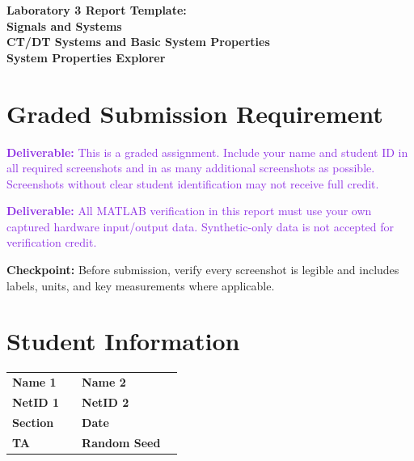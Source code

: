 \documentclass[11pt,letterpaper]{article}
\providecommand{\cpECE}[1]{\textcolor{OliveGreen}{\textbf{Checkpoint:} #1}}
\providecommand{\delECE}[1]{\textcolor{BlueViolet}{\textbf{Deliverable:} #1}}
\begin{document}
\begin{center}
\huge{\bf Laboratory 3 Report Template:}\\
\large{\bf Signals and Systems}\\
\large{\bf CT/DT Systems and Basic System Properties}\\
\large{\bf System Properties Explorer}
\end{center}

\section*{Graded Submission Requirement}
\delECE{This is a graded assignment. Include your name and student ID in all required screenshots and in as many additional screenshots as possible. Screenshots without clear student identification may not receive full credit.}

\delECE{All MATLAB verification in this report must use your own captured hardware input/output data. Synthetic-only data is not accepted for verification credit.}

\cpECE{Before submission, verify every screenshot is legible and includes labels, units, and key measurements where applicable.}

\section*{Student Information}
\begin{tabularx}{\linewidth}{l X l X}
\toprule
\textbf{Name 1} & \underline{\hspace{5cm}} & \textbf{Name 2} & \underline{\hspace{5cm}} \\
\textbf{NetID 1} & \underline{\hspace{5cm}} & \textbf{NetID 2} & \underline{\hspace{5cm}} \\
\textbf{Section} & \underline{\hspace{5cm}} & \textbf{Date} & \underline{\hspace{5cm}} \\
\textbf{TA} & \underline{\hspace{5cm}} & \textbf{Random Seed} & \underline{\hspace{5cm}} \\
\bottomrule
\end{tabularx}
\end{document}
